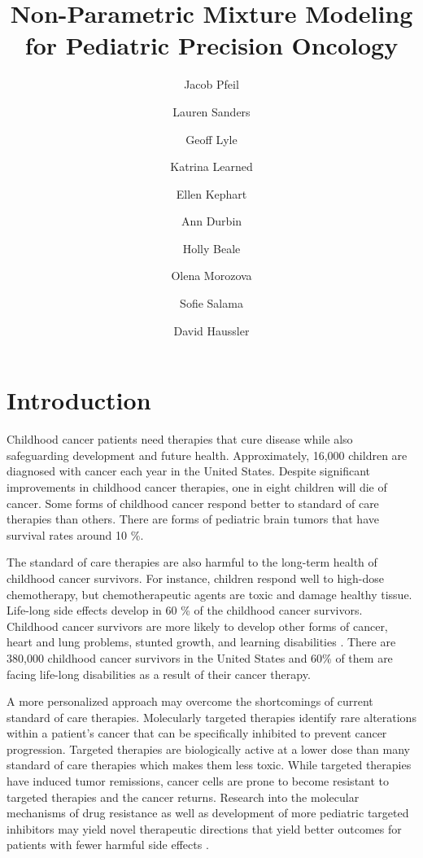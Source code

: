 \documentclass[fleqn,10pt]{wlscirep}
\title{Non-Parametric Mixture Modeling for Pediatric Precision Oncology}
\author[1,*]{Jacob Pfeil}
\author[1]{Lauren Sanders}
\author[1]{Geoff Lyle}
\author[1]{Katrina Learned}
\author[1]{Ellen Kephart}
\author[1]{Ann Durbin}
\author[1]{Holly Beale}
\author[1]{Olena Morozova}
\author[1]{Sofie Salama}
\author[1]{David Haussler}
\affil[1]{University of California, Santa Cruz, Biomolecular Engineering, Santa Cruz, 95064, United States}
\affil[*]{jpfeil@ucsc.edu}
\newcommand{\textapprox}{\raisebox{0.5ex}{\texttildelow}}
\begin{document}
\flushbottom
\maketitle
%
%
\thispagestyle{empty}


\section*{Introduction}


Childhood cancer patients need therapies that cure disease while also safeguarding development and future health. Approximately, 16,000 children are diagnosed with cancer each year in the United States. Despite significant improvements in childhood cancer therapies, one in eight children will die of cancer. Some forms of childhood cancer respond better to standard of care therapies than others. There are forms of pediatric brain tumors that have survival rates around \textapprox 10 \%. 

The standard of care therapies are also harmful to the long-term health of childhood cancer survivors. For instance, children respond well to high-dose chemotherapy, but chemotherapeutic agents are toxic and damage healthy tissue. Life-long side effects develop in \textapprox 60 \% of the childhood cancer survivors. Childhood cancer survivors are more likely to develop other forms of cancer, heart and lung problems, stunted growth, and learning disabilities \cite{cancer.org:longTermEffects,kopp2012late,AmericanCancerSociety:ChildCancer}. There are \textapprox 380,000 childhood cancer survivors in the United States and 60\% of them are facing life-long disabilities as a result of their cancer therapy.

A more personalized approach may overcome the shortcomings of current standard of care therapies. Molecularly targeted therapies identify rare alterations within a patient's cancer that can be specifically inhibited to prevent cancer progression. Targeted therapies are biologically active at a lower dose than many standard of care therapies which makes them less toxic. While targeted therapies have induced tumor remissions, cancer cells are prone to become resistant to targeted therapies and the cancer returns. Research into the molecular mechanisms of drug resistance as well as development of more pediatric targeted inhibitors may yield novel therapeutic directions that yield better outcomes for patients with fewer harmful side effects \cite{norris2012challenges}. 
\end{document}
